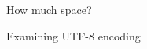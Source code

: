 \documentclass[../index.tex]{subfiles}
\begin{document}
\renewcommand{\currenttitle}{How much space?}
\begin{frame}{\currenttitle}
%
%
\end{frame}

\renewcommand{\currenttitle}{Examining UTF-8 encoding}
\begin{frame}{\currenttitle}
%
%
%
%
\end{frame}
\end{document}
